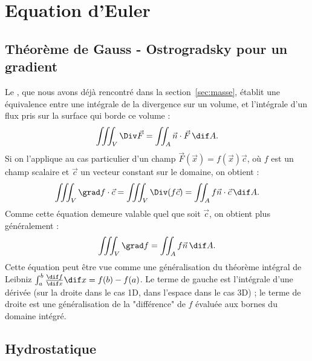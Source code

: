 \chapter{Equation d'Euler}
\label{ch:euler}

\section{Théorème de Gauss - Ostrogradsky pour un gradient}
Le , que nous avons déjà rencontré dans la section~\ref{sec:masse}, établit une équivalence entre une intégrale de la divergence sur un volume, et l'intégrale d'un flux pris sur la surface qui borde ce volume :
\begin{equation}
  \iiint_V \Div \vec{F} = \iint_A \vec{n} \cdot \vec{F}\, \dif A.
  \label{eq:gauss}
\end{equation}
Si on l'applique au cas particulier d'un champ $\vec{F}(\vec{x}) = f(\vec{x})\vec{c}$, où $f$ est un champ scalaire et $\vec{c}$ un vecteur constant sur le domaine, on obtient :
\begin{equation*}
  \iiint_V \grad f \cdot \vec{c} = \iiint_V \Div (f\vec{c}) = \iint_A f \vec{n} \cdot \vec{c}\, \dif A.
\end{equation*}
Comme cette équation demeure valable quel que soit $\vec{c}$, on obtient plus généralement :
\begin{equation}
  \iiint_V \grad f = \iint_A f \vec{n}\, \dif A.
  \label{eq:integral_of_gradient}
\end{equation}
Cette équation peut être vue comme une généralisation du théorème intégral de Leibniz $\int_a^b \frac{\dif f}{\dif x} \dif x = f(b) - f(a)$. Le terme de gauche est l'intégrale d'une dérivée (sur la droite dans le cas 1D, dans l'espace dans le cas 3D) ; le terme de droite est une généralisation de la "différence" de $f$ évaluée aux bornes du domaine intégré.

\section{Hydrostatique}

